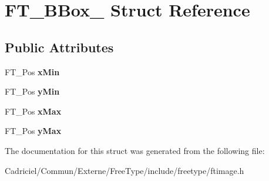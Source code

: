 \hypertarget{struct_f_t___b_box__}{\section{F\-T\-\_\-\-B\-Box\-\_\- Struct Reference}
\label{struct_f_t___b_box__}
}
\subsection*{Public Attributes}
\begin{DoxyCompactItemize}
\item 
\hypertarget{struct_f_t___b_box___a1f2a5d0565d496c1d41e43d018f45add}{F\-T\-\_\-\-Pos {\bfseries x\-Min}}\label{struct_f_t___b_box___a1f2a5d0565d496c1d41e43d018f45add}

\item 
\hypertarget{struct_f_t___b_box___a959ca1d5bc1c5338da0d85c8e7135f4e}{F\-T\-\_\-\-Pos {\bfseries y\-Min}}\label{struct_f_t___b_box___a959ca1d5bc1c5338da0d85c8e7135f4e}

\item 
\hypertarget{struct_f_t___b_box___ac6da5c44f4cb7b97eef1f438eb69c0ec}{F\-T\-\_\-\-Pos {\bfseries x\-Max}}\label{struct_f_t___b_box___ac6da5c44f4cb7b97eef1f438eb69c0ec}

\item 
\hypertarget{struct_f_t___b_box___a77084921589f386a8a593ae1f25b1569}{F\-T\-\_\-\-Pos {\bfseries y\-Max}}\label{struct_f_t___b_box___a77084921589f386a8a593ae1f25b1569}

\end{DoxyCompactItemize}


The documentation for this struct was generated from the following file\-:\begin{DoxyCompactItemize}
\item 
Cadriciel/\-Commun/\-Externe/\-Free\-Type/include/freetype/ftimage.\-h\end{DoxyCompactItemize}
